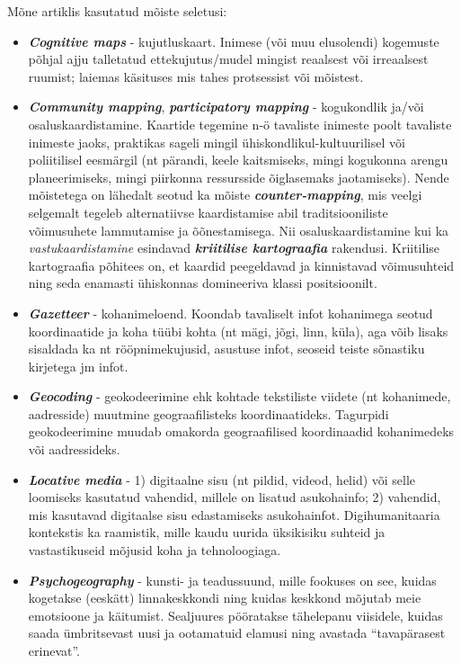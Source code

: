 \documentclass[
]{book}
\providecommand{\tightlist}{%
  \setlength{\itemsep}{0pt}\setlength{\parskip}{0pt}}
\begin{document}
Mõne artiklis kasutatud mõiste seletusi:

\begin{itemize}
\tightlist
\item
  \textbf{\emph{Cognitive maps}} - kujutluskaart. Inimese (või muu elusolendi) kogemuste põhjal ajju talletatud ettekujutus/mudel mingist reaalsest või irreaalsest ruumist; laiemas käsituses mis tahes protsessist või mõistest.\\
\item
  \textbf{\emph{Community mapping}}, \textbf{\emph{participatory mapping}} - kogukondlik ja/või osaluskaardistamine. Kaartide tegemine n-ö tavaliste inimeste poolt tavaliste inimeste jaoks, praktikas sageli mingil ühiskondlikul-kultuurilisel või poliitilisel eesmärgil (nt pärandi, keele kaitsmiseks, mingi kogukonna arengu planeerimiseks, mingi piirkonna ressursside õiglasemaks jaotamiseks). Nende mõistetega on lähedalt seotud ka mõiste \textbf{\emph{counter-mapping}}, mis veelgi selgemalt tegeleb alternatiivse kaardistamise abil traditsiooniliste võimusuhete lammutamise ja õõnestamisega. Nii osaluskaardistamine kui ka \emph{vastukaardistamine} esindavad \textbf{\emph{kriitilise kartograafia}} rakendusi. Kriitilise kartograafia põhitees on, et kaardid peegeldavad ja kinnistavad võimusuhteid ning seda enamasti ühiskonnas domineeriva klassi positsioonilt.\\
\item
  \textbf{\emph{Gazetteer}} - kohanimeloend. Koondab tavaliselt infot kohanimega seotud koordinaatide ja koha tüübi kohta (nt mägi, jõgi, linn, küla), aga võib lisaks sisaldada ka nt rööpnimekujusid, asustuse infot, seoseid teiste sõnastiku kirjetega jm infot.\\
\item
  \textbf{\emph{Geocoding}} - geokodeerimine ehk kohtade tekstiliste viidete (nt kohanimede, aadresside) muutmine geograafilisteks koordinaatideks. Tagurpidi geokodeerimine muudab omakorda geograafilised koordinaadid kohanimedeks või aadressideks.\\
\item
  \textbf{\emph{Locative media}} - 1) digitaalne sisu (nt pildid, videod, helid) või selle loomiseks kasutatud vahendid, millele on lisatud asukohainfo; 2) vahendid, mis kasutavad digitaalse sisu edastamiseks asukohainfot. Digihumanitaaria kontekstis ka raamistik, mille kaudu uurida üksikisiku suhteid ja vastastikuseid mõjusid koha ja tehnoloogiaga.\\
\item
  \textbf{\emph{Psychogeography}} - kunsti- ja teadussuund, mille fookuses on see, kuidas kogetakse (eeskätt) linnakeskkondi ning kuidas keskkond mõjutab meie emotsioone ja käitumist. Sealjuures pööratakse tähelepanu viisidele, kuidas saada ümbritsevast uusi ja ootamatuid elamusi ning avastada ``tavapärasest erinevat''.\\

\end{itemize}
\end{document}
